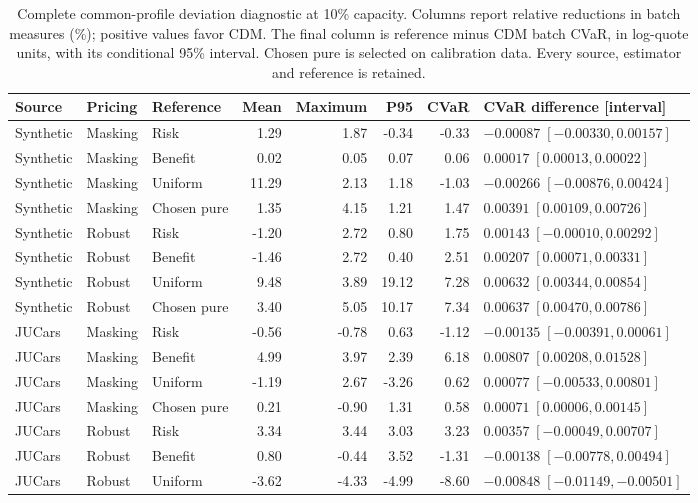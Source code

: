 \begin{table}[t]
\centering
\caption{Complete common-profile deviation diagnostic at 10\% capacity.
Columns report relative reductions in batch measures (\%); positive values
favor CDM. The final column is reference minus CDM batch CVaR, in log-quote
units, with its conditional 95\% interval. Chosen pure is selected on
calibration data. Every source, estimator and reference is retained.}
\label{tab:cdm_deviation_generalization}
\setlength{\tabcolsep}{3pt}
\begin{tabular}{lllrrrrl}
\toprule
Source & Pricing & Reference & Mean & Maximum & P95 & CVaR & CVaR difference [interval]\\
\midrule
Synthetic & Masking & Risk & 1.29 & 1.87 & -0.34 & -0.33 & $-0.00087\;[-0.00330,0.00157]$\\
Synthetic & Masking & Benefit & 0.02 & 0.05 & 0.07 & 0.06 & $0.00017\;[0.00013,0.00022]$\\
Synthetic & Masking & Uniform & 11.29 & 2.13 & 1.18 & -1.03 & $-0.00266\;[-0.00876,0.00424]$\\
Synthetic & Masking & Chosen pure & 1.35 & 4.15 & 1.21 & 1.47 & $0.00391\;[0.00109,0.00726]$\\
Synthetic & Robust & Risk & -1.20 & 2.72 & 0.80 & 1.75 & $0.00143\;[-0.00010,0.00292]$\\
Synthetic & Robust & Benefit & -1.46 & 2.72 & 0.40 & 2.51 & $0.00207\;[0.00071,0.00331]$\\
Synthetic & Robust & Uniform & 9.48 & 3.89 & 19.12 & 7.28 & $0.00632\;[0.00344,0.00854]$\\
Synthetic & Robust & Chosen pure & 3.40 & 5.05 & 10.17 & 7.34 & $0.00637\;[0.00470,0.00786]$\\
JUCars & Masking & Risk & -0.56 & -0.78 & 0.63 & -1.12 & $-0.00135\;[-0.00391,0.00061]$\\
JUCars & Masking & Benefit & 4.99 & 3.97 & 2.39 & 6.18 & $0.00807\;[0.00208,0.01528]$\\
JUCars & Masking & Uniform & -1.19 & 2.67 & -3.26 & 0.62 & $0.00077\;[-0.00533,0.00801]$\\
JUCars & Masking & Chosen pure & 0.21 & -0.90 & 1.31 & 0.58 & $0.00071\;[0.00006,0.00145]$\\
JUCars & Robust & Risk & 3.34 & 3.44 & 3.03 & 3.23 & $0.00357\;[-0.00049,0.00707]$\\
JUCars & Robust & Benefit & 0.80 & -0.44 & 3.52 & -1.31 & $-0.00138\;[-0.00778,0.00494]$\\
JUCars & Robust & Uniform & -3.62 & -4.33 & -4.99 & -8.60 & $-0.00848\;[-0.01149,-0.00501]$\\

\end{tabular}
\end{table}
